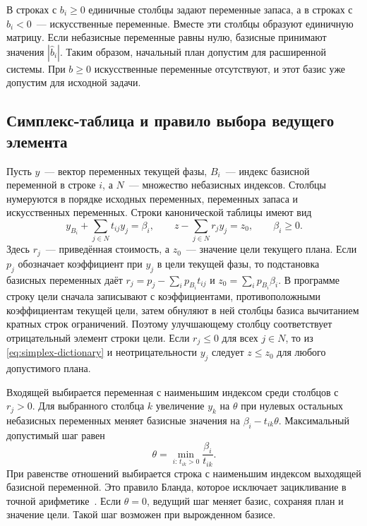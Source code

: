 В строках с $b_i\geq 0$ единичные столбцы задают переменные запаса,
а в строках с $b_i<0$~--- искусственные переменные. Вместе эти столбцы
образуют единичную матрицу. Если небазисные переменные равны нулю,
базисные принимают значения $|\widehat b_i|$. Таким образом, начальный
план допустим для расширенной системы. При $b\geq0$ искусственные
переменные отсутствуют, и этот базис уже допустим для исходной задачи.

\subsection{Симплекс-таблица и правило выбора ведущего элемента}

Пусть $y$~--- вектор переменных текущей фазы, $B_i$~--- индекс
базисной переменной в строке $i$, а $N$~--- множество небазисных
индексов. Столбцы нумеруются в порядке исходных переменных, переменных
запаса и искусственных переменных. Строки канонической таблицы имеют вид
\begin{equation}
  y_{B_i}+\sum_{j\in N}t_{ij}y_j=\beta_i,\qquad
  z-\sum_{j\in N}r_jy_j=z_0,\qquad \beta_i\geq0.
  \label{eq:simplex-dictionary}
\end{equation}
Здесь $r_j$~--- приведённая стоимость, а $z_0$~--- значение цели
текущего плана. Если $p_j$ обозначает коэффициент при $y_j$ в цели
текущей фазы, то подстановка базисных переменных даёт
$r_j=p_j-\sum_i p_{B_i}t_{ij}$ и $z_0=\sum_i p_{B_i}\beta_i$.
В программе строку цели сначала записывают с
коэффициентами, противоположными коэффициентам текущей цели, затем
обнуляют в ней столбцы базиса вычитанием кратных строк ограничений.
Поэтому улучшающему столбцу соответствует отрицательный элемент
строки цели. Если $r_j\leq0$ для всех $j\in N$, то из
\eqref{eq:simplex-dictionary} и неотрицательности $y_j$ следует
$z\leq z_0$ для любого допустимого плана.

Входящей выбирается переменная с наименьшим индексом среди столбцов
с $r_j>0$. Для выбранного столбца $k$ увеличение $y_k$ на $\theta$
при нулевых остальных небазисных переменных меняет базисные значения
на $\beta_i-t_{ik}\theta$. Максимальный допустимый шаг равен
\begin{equation}
  \theta=\min_{i:\,t_{ik}>0}\frac{\beta_i}{t_{ik}}.
  \label{eq:simplex-ratio}
\end{equation}
При равенстве отношений выбирается строка с наименьшим индексом
выходящей базисной переменной. Это правило Бланда, которое исключает
зацикливание в точной арифметике~\cite{bland1977}. Если $\theta=0$,
ведущий шаг меняет базис, сохраняя план и значение цели. Такой шаг
возможен при вырожденном базисе.

